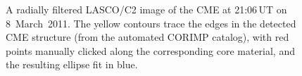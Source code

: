 \documentclass[namedreferences]{solarphysics}
\begin{document}
\begin{article}
\begin{figure}[t]
\caption{A radially filtered LASCO/C2 image of the CME at 21:06\,UT on 8~March~2011. The yellow contours trace the edges in the detected CME structure (from the automated CORIMP catalog), with red points manually clicked along the corresponding core material, and the resulting ellipse fit in blue.}
\label{lasco_c2_fig}
\end{figure}



\end{article}
\end{document}
